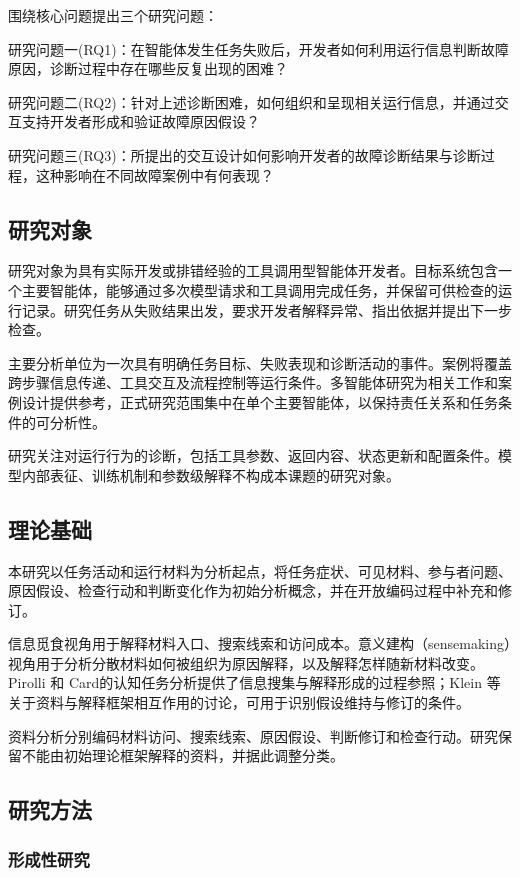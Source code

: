 围绕核心问题提出三个研究问题：

研究问题一(RQ1)：在智能体发生任务失败后，开发者如何利用运行信息判断故障原因，诊断过程中存在哪些反复出现的困难？

研究问题二(RQ2)：针对上述诊断困难，如何组织和呈现相关运行信息，并通过交互支持开发者形成和验证故障原因假设？

研究问题三(RQ3)：所提出的交互设计如何影响开发者的故障诊断结果与诊断过程，这种影响在不同故障案例中有何表现？

\subsection{研究对象}

研究对象为具有实际开发或排错经验的工具调用型智能体开发者。目标系统包含一个主要智能体，能够通过多次模型请求和工具调用完成任务，并保留可供检查的运行记录。研究任务从失败结果出发，要求开发者解释异常、指出依据并提出下一步检查。

主要分析单位为一次具有明确任务目标、失败表现和诊断活动的事件。案例将覆盖跨步骤信息传递、工具交互及流程控制等运行条件。多智能体研究为相关工作和案例设计提供参考，正式研究范围集中在单个主要智能体，以保持责任关系和任务条件的可分析性。

研究关注对运行行为的诊断，包括工具参数、返回内容、状态更新和配置条件。模型内部表征、训练机制和参数级解释不构成本课题的研究对象。

\subsection{理论基础}

本研究以任务活动和运行材料为分析起点，将任务症状、可见材料、参与者问题、原因假设、检查行动和判断变化作为初始分析概念，并在开放编码过程中补充和修订。

信息觅食视角用于解释材料入口、搜索线索和访问成本。意义建构（sensemaking）视角用于分析分散材料如何被组织为原因解释，以及解释怎样随新材料改变。Pirolli 和 Card\cite{ref17}的认知任务分析提供了信息搜集与解释形成的过程参照；Klein 等\cite{ref11}关于资料与解释框架相互作用的讨论，可用于识别假设维持与修订的条件。

资料分析分别编码材料访问、搜索线索、原因假设、判断修订和检查行动。研究保留不能由初始理论框架解释的资料，并据此调整分类。

\subsection{研究方法}

\subsubsection{形成性研究}

